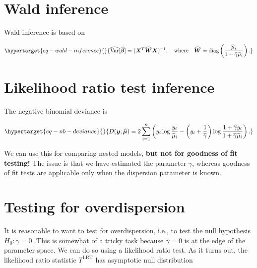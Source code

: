\documentclass[
  11pt,
  letterpaper,
  oneside]{book}
\theoremstyle{plain}
\theoremstyle{plain}
\theoremstyle{definition}
\theoremstyle{definition}
\theoremstyle{plain}
\theoremstyle{remark}
\begin{document}
\hypertarget{wald-inference}{%
\section{Wald inference}\label{wald-inference}}

Wald inference is based on

\begin{equation}\protect\hypertarget{eq-wald-inference}{}{
\widehat{\text{Var}}[\boldsymbol{\widehat{\beta}}] = (\boldsymbol{X}^T \boldsymbol{\widehat{W}} \boldsymbol{X})^{-1}, \quad \text{where} \quad \boldsymbol{\widehat{W}} = \text{diag}\left(\frac{\widehat{\mu}_i}{1 + \widehat{\gamma} \widehat{\mu}_i}\right).
}\label{eq-wald-inference}\end{equation}

\hypertarget{likelihood-ratio-test-inference}{%
\section{Likelihood ratio test
inference}\label{likelihood-ratio-test-inference}}

The negative binomial deviance is

\begin{equation}\protect\hypertarget{eq-nb-deviance}{}{
D(\boldsymbol{y}; \boldsymbol{\widehat{\mu}}) = 2\sum_{i = 1}^n \left(y_i \log \frac{y_i}{\widehat{\mu}_i} - \left(y_i + \frac{1}{\widehat{\gamma}}\right)\log \frac{1 + \widehat{\gamma} y_i}{1 + \widehat{\gamma} \widehat{\mu}_i}\right).
}\label{eq-nb-deviance}\end{equation}

We can use this for comparing nested models, \textbf{but not for
goodness of fit testing!} The issue is that we have estimated the
parameter \(\gamma\), whereas goodness of fit tests are applicable only
when the dispersion parameter is known.

\hypertarget{testing-for-overdispersion}{%
\section{Testing for overdispersion}\label{testing-for-overdispersion}}

It is reasonable to want to test for overdispersion, i.e., to test the
null hypothesis \(H_0: \gamma = 0\). This is somewhat of a tricky task
because \(\gamma = 0\) is at the edge of the parameter space. We can do
so using a likelihood ratio test. As it turns out, the likelihood ratio
statistic \(T^{\text{LRT}}\) has asymptotic null distribution
\end{document}
